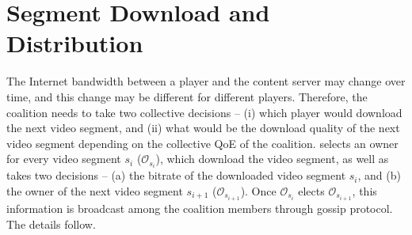 \section{Segment Download and Distribution}
\label{sec:chap06:segment}
The Internet bandwidth between a player and the content server may change over time, and this change may be different for different {\our} players. Therefore, the coalition needs to take two collective decisions -- (i) which player would download the next video segment, and (ii) what would be the download quality of the next video segment depending on the collective \ac{QoE} of the coalition. {\our} selects an owner for every video segment $s_i$ ($\mathcal{O}_{s_i}$), which download the video segment, as well as takes two decisions -- (a) the bitrate of the downloaded video segment $s_i$, and (b) the owner of the next video segment $s_{i+1}$ ($\mathcal{O}_{s_{i+1}}$). Once $\mathcal{O}_{s_i}$ elects $\mathcal{O}_{s_{i+1}}$, this information is broadcast among the coalition members through gossip protocol. The details follow. 

